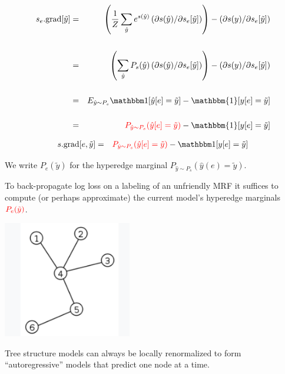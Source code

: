 {\bigskip
\begin{eqnarray*}
    s_e.\mathrm{grad}[\tilde{y}]
    & = & \left(\frac{1}{Z} \sum_{\hat{y}} e^{s(\hat{y})} \left(\partial s(\hat{y})/\partial s_e[\tilde{y}]\right)\right)
    - \left(\partial s(y) /\partial s_e[\tilde{y}]\right)    \\
    \\
    & = & \left(\sum_{\hat{y}} P_s(\hat{y}) \left(\partial s(\hat{y})/\partial s_e[\tilde{y}]\right)\right)
    - \left(\partial s(y) /\partial s_e[\tilde{y}]\right)    \\
    \\
    & = & E_{\hat{y} \sim P_s}\bbone[\hat{y}[e] = \tilde{y}]
    - \mathbbm{1}[y[e] = \tilde{y}] \\
    \\
    & = & {\color{red} P_{\hat{y} \sim P_s}(\hat{y}[e] = \tilde{y})}
      - \mathbbm{1}[y[e] = \tilde{y}]
\end{eqnarray*}


\begin{eqnarray*}
    s.\mathrm{grad}[e,\tilde{y}]
    & = &  {\color{red} P_{\hat{y} \sim P_s}(\hat{y}[e] = \tilde{y})} - \bbone[y[e] = \tilde{y}] \\
\end{eqnarray*}

\vfill
We write {\color{red} $P_e(\tilde{y})$} for the {\color{red} hyperedge marginal} $P_{\hat{y} \sim P_s}(\hat{y}(e) = \tilde{y})$.

\vfill
To back-propagate log loss on a labeling of an unfriendly MRF {\color{red} it suffices to compute (or perhaps approximate)
the current model's hyperedge marginals ${\color{red} P_e(\tilde{y})}$.}


\centerline{\includegraphics[height= 2in]{../images/Tree}}

\vfill
Tree structure models can always be locally renormalized to form ``autoregressive'' models that
predict one node at a time.

}
